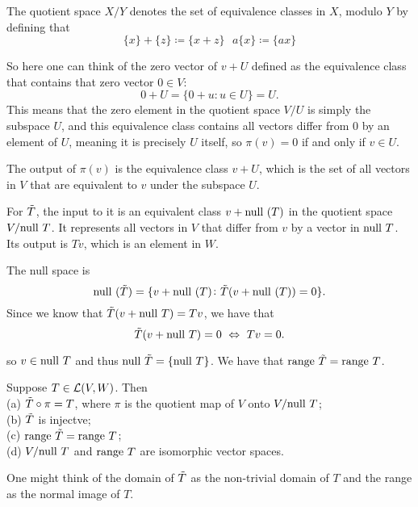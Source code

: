 \documentclass{extarticle}
\begin{document}
The quotient space \(X / Y\) denotes the set of equivalence classes in \(X\), modulo \(Y\) by defining that 
\[\{x\} + \{z\} \coloneqq \{x+ z\} \ \ \ a\{x\} \coloneqq \{ax\}\]

So here one can think of the zero vector of \(v + U\) defined as the equivalence class that contains that 
zero vector \(0 \in V\): 
\[0 + U = \{0 + u \colon u \in U\} = U.\]
This means that the zero element in the quotient space \(V / U\) is simply the subspace \(U\), and this 
equivalence class contains all vectors differ from 0 by an element of \(U\), meaning it is precisely 
\(U\) itself, so \(\pi(v) = 0\) if and only if \(v \in U\). 

\begin{remark}
    The output of \(\pi(v)\) is the equivalence class \(v + U\), which is the set of all vectors in \(V\)
    that are equivalent to \(v\) under the subspace \(U\).
\end{remark}

For \(\Tilde{T}\), the input to it is an equivalent class \(v + \text{null } (T)\) in the quotient space \(V / \text{null } T\). 
It represents all vectors in \(V\) that differ from \(v\) by a vector in \(\text{null } T\). Its output is 
\(T v\), which is an element in \(W\). 

The null space is 
\[\text{null } (\tilde{T}) = \{v + \text{null }(T) \colon \tilde{T}(v + \text{null } (T)) = 0\}. \]
Since we know that \(\tilde{T}(v + \text{null } T) = Tv\), we have that 
\[\tilde{T}(v + \text{null } T) = 0 \ \Leftrightarrow \ Tv = 0.\]

so \(v \in \text{null } T\) and thus \(\text{null } \tilde{T} = \{\text{null } T\}\). We have that \(\text{range } \tilde{T} = \text{range } T\).

\begin{thm}
    Suppose \(T \in \mathcal{L}(V, W)\). Then \\ 
    (a) \(\tilde{T} \circ \pi = T\), where \(\pi\) is the quotient map of \(V\) onto \(V / \text{null } T\); \\ 
    (b) \(\tilde{T}\) is injectve;\\ 
    (c) \(\text{range } \tilde{T} = \text{range } T\);\\ 
    (d) \(V / \text{null } T\) and \(\text{range } T\) are isomorphic vector spaces. 
\end{thm}

\begin{remark}
    One might think of the domain of \(\tilde{T}\) as the non-trivial domain of \(T\) and the range as the normal 
    image of \(T\). 
\end{remark}

\newpage 
{}
\end{document}
